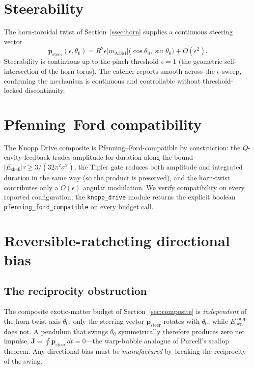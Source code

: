 \documentclass[11pt,a4paper]{article}
\begin{document}
\section{Steerability}\label{sec:steering}

The horn-toroidal twist of Section~\ref{ssec:horn} supplies a continuous steering vector
\begin{equation}
\bm{p}_{\mathrm{steer}}(\epsilon,\theta_{0}) = R^{2}\epsilon|m_{\mathrm{ADM}}|\bigl(\cos\theta_{0},\sin\theta_{0}\bigr) + O(\epsilon^{2}).
\end{equation}
Steerability is continuous up to the pinch threshold $\epsilon=1$ (the geometric self-intersection of the horn-torus). The catcher reports smooth across the $\epsilon$ sweep, confirming the mechanism is continuous and controllable without threshold-locked discontinuity.

\section{Pfenning--Ford compatibility}

The Knopp Drive composite is Pfenning--Ford-compatible by construction: the $Q$-cavity feedback trades amplitude for duration along the bound $|E_{\mathrm{shell}}|\tau\ge 3/(32\pi^{2}\sigma^{2})$, the Tipler gate reduces both amplitude and integrated duration in the same way (so the product is preserved), and the horn-twist contributes only a $O(\epsilon)$ angular modulation. We verify compatibility on every reported configuration; the \texttt{knopp\_drive} module returns the explicit boolean \texttt{pfenning\_ford\_compatible} on every budget call.

\section{Reversible-ratcheting directional bias}\label{sec:bias}

\subsection{The reciprocity obstruction}
The composite exotic-matter budget of Section~\ref{sec:composite} is \emph{independent} of the horn-twist axis $\theta_{0}$: only the steering vector $\bm{p}_{\mathrm{steer}}$ rotates with $\theta_{0}$, while $E_{\mathrm{neg}}^{\mathrm{comp}}$ does not. A pendulum that swings $\theta_{0}$ symmetrically therefore produces zero net impulse, $\bm{J}=\oint \bm{p}_{\mathrm{steer}}\,dt=0$---the warp-bubble analogue of Purcell's scallop theorem. Any directional bias must be \emph{manufactured} by breaking the reciprocity of the swing.
\end{document}
